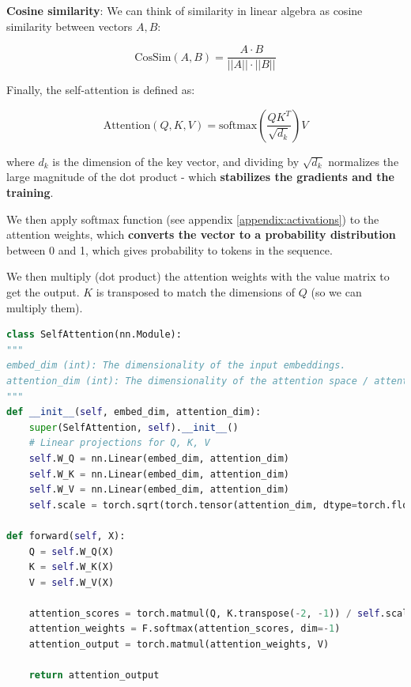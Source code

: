\textbf{Cosine similarity}: We can think of similarity in linear algebra as cosine similarity between vectors $A, B$: 

\[ \text{CosSim} (A, B) = \frac{A \cdot B}{||A||\cdot ||B||} \]

Finally, the self-attention is defined as:

\begin{equation}
    \text{Attention}(Q, K, V) = \text{softmax}\left( \frac{QK^T}{\sqrt{d_k}} \right) V
    \label{eq:self_attention}
\end{equation}

where $d_k$ is the dimension of the key vector, and dividing by $\sqrt{d_k}$ normalizes the large magnitude of the dot product - which \textbf{stabilizes the gradients and the training}.

We then apply softmax function (see appendix \ref{appendix:activations}) to the attention weights, which \textbf{converts the vector to a probability distribution} between 0 and 1, which gives probability to tokens in the sequence. 

We then multiply (dot product) the attention weights with the value matrix to get the output. $K$ is transposed to match the dimensions of $Q$ (so we can multiply them).

\begin{lstlisting}[language=Python, breaklines=true, caption={Full implementation of a single self-attention block.}]
class SelfAttention(nn.Module):
"""
embed_dim (int): The dimensionality of the input embeddings.
attention_dim (int): The dimensionality of the attention space / attention vectors (Q, K, V).
"""
def __init__(self, embed_dim, attention_dim):
    super(SelfAttention, self).__init__()
    # Linear projections for Q, K, V
    self.W_Q = nn.Linear(embed_dim, attention_dim)
    self.W_K = nn.Linear(embed_dim, attention_dim)
    self.W_V = nn.Linear(embed_dim, attention_dim)
    self.scale = torch.sqrt(torch.tensor(attention_dim, dtype=torch.float32))

def forward(self, X):
    Q = self.W_Q(X)
    K = self.W_K(X)
    V = self.W_V(X)

    attention_scores = torch.matmul(Q, K.transpose(-2, -1)) / self.scale
    attention_weights = F.softmax(attention_scores, dim=-1)
    attention_output = torch.matmul(attention_weights, V)

    return attention_output
\end{lstlisting}










